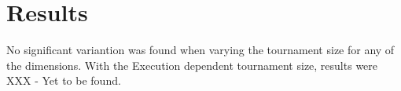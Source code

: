 \section{Results}
\label{sec:results}
No significant variantion was found when varying the tournament size for any of the dimensions. With the Execution dependent tournament size, results were XXX - Yet to be found.